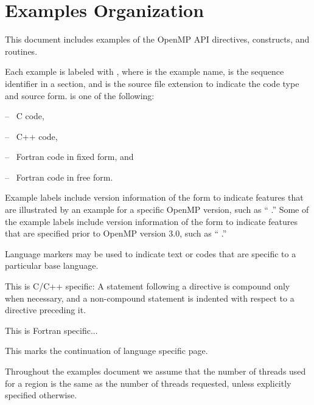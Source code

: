 \section{Examples Organization}
\label{chap:examples}
\label{sec:examples}

This document includes examples of the OpenMP API directives, constructs, and routines.

Each example is labeled with , where  is 
the example name,  is the sequence identifier in a section, and 
 is the source file extension to indicate the code type and 
source form.   is one of the following:
\begin{description}[noitemsep,labelindent=5mm,widest=f90]
\item[\plc{c}] -- \ C code,
\item[\plc{cpp}] -- \ C++ code,
\item[\plc{f}] -- \ Fortran code in fixed form, and
\item[\plc{f90}] -- \ Fortran code in free form.
\end{description}

Example labels include version information of the form
 to indicate features that are illustrated
by an example for a specific OpenMP version, such as 
`` \;.''
Some of the example labels include version information of the form
 to indicate features that are specified 
prior to OpenMP version 3.0, such as
`` \;.''

Language markers may be used to indicate text or codes that are specific 
to a particular base language.
\begin{ccppspecific}
This is C/C++ specific: 
A statement following a directive is compound only when necessary, and a 
non-compound statement is indented with respect to a directive preceding it.
\end{ccppspecific}
\begin{fortranspecific}
This is Fortran specific...
\end{fortranspecific}
This marks the continuation of language specific page.

\medskip
Throughout the examples document we assume that the number of threads 
used for a  region is the same as 
the number of threads requested, unless explicitly specified otherwise.

